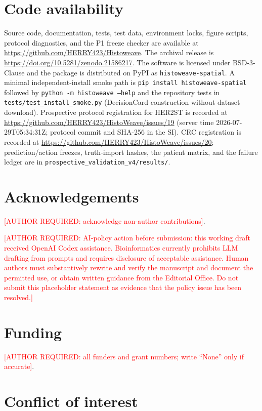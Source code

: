 \documentclass[12pt]{article}
\newcommand{\required}[1]{\textcolor{red}{[AUTHOR REQUIRED: #1]}}
\begin{document}
\section*{Code availability}

Source code, documentation, tests, test data, environment locks, figure
scripts, protocol diagnostics, and the P1 freeze checker are available at
\url{https://github.com/HERRY423/Histoweave}. The archival release is
\url{https://doi.org/10.5281/zenodo.21586217}. The software is licensed under
BSD-3-Clause and the package is distributed on PyPI as
\texttt{histoweave-spatial}. A minimal independent-install smoke path is
\texttt{pip install histoweave-spatial} followed by
\texttt{python -m histoweave --help} and the repository tests in
\texttt{tests/test\_install\_smoke.py} (DecisionCard construction without
dataset download). Prospective protocol registration for HER2ST is recorded at
\url{https://github.com/HERRY423/HistoWeave/issues/19}
(server time 2026-07-29T05:34:31Z; protocol commit and SHA-256 in the SI).
CRC registration is recorded at
\url{https://github.com/HERRY423/HistoWeave/issues/20}; prediction/action
freezes, truth-import hashes, the patient matrix, and the failure ledger are in
\texttt{prospective\_validation\_v4/results/}.

\section*{Acknowledgements}

\required{acknowledge non-author contributions}.

\required{AI-policy action before submission: this working draft received
OpenAI Codex assistance. Bioinformatics currently prohibits LLM drafting from
prompts and requires disclosure of acceptable assistance. Human authors must
substantively rewrite and verify the manuscript and document the permitted
use, or obtain written guidance from the Editorial Office. Do not submit this
placeholder statement as evidence that the policy issue has been resolved.}

\section*{Funding}

\required{all funders and grant numbers; write ``None'' only if accurate}.

\section*{Conflict of interest}
\end{document}
